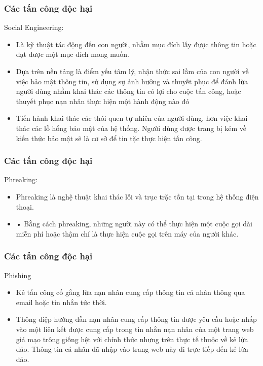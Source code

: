 \documentclass{beamer}
\begin{document}
\begin{frame}
\frametitle{Các tấn công độc hại}
    \begin{block}{Social Engineering:}
         \begin{itemize}
    \item Là kỹ thuật tác động đến con người, nhằm mục đích lấy được thông tin hoặc đạt được một mục đích mong muốn. 
    \item Dựa trên nền tảng là điểm yếu tâm lý, nhận thức sai lầm của con người về việc bảo mật thông tin, sử dụng sự ảnh hưởng và thuyết phục để đánh lừa người dùng nhằm khai thác các thông tin có lợi cho cuộc tấn công, hoặc thuyết phục nạn nhân thực hiện một hành động nào đó
    \item Tiến hành khai thác các thói quen tự nhiên của người dùng, hơn việc khai thác các lỗ hổng bảo mật của hệ thống. Người dùng được trang bị kém về kiến thức bảo mật sẽ là cơ sở để tin tặc thực hiện tấn công.
\end{itemize}
    \end{block}
\end{frame}
\begin{frame}
\frametitle{Các tấn công độc hại}
    \begin{block}{Phreaking:}
         \begin{itemize}
    \item Phreaking là nghệ thuật khai thác lỗi và trục trặc tồn tại trong hệ thống điện thoại.
    \item •	Bằng cách phreaking, những người này có thể thực hiện một cuộc gọi dài miễn phí hoặc thậm chí là thực hiện cuộc gọi trên máy của người khác.
\end{itemize}
    \end{block}
\end{frame}
\begin{frame}
\frametitle{Các tấn công độc hại}
    \begin{block}{Phishing}
         \begin{itemize}
    \item Kẻ tấn công cố gắng lừa nạn nhân cung cấp thông tin cá nhân thông qua email hoặc tin nhắn tức thời. 
    \item Thông điệp hướng dẫn nạn nhân cung cấp thông tin được yêu cầu hoặc nhấp vào một liên kết được cung cấp trong tin nhắn  nạn nhân của một trang web giả mạo trông giống hệt với chính thức nhưng trên thực tế thuộc về kẻ lừa đảo. Thông tin cá nhân đã nhập vào trang web này đi trực tiếp đến kẻ lừa đảo.
\end{itemize}
    \end{block}
\end{frame}
\end{document}
